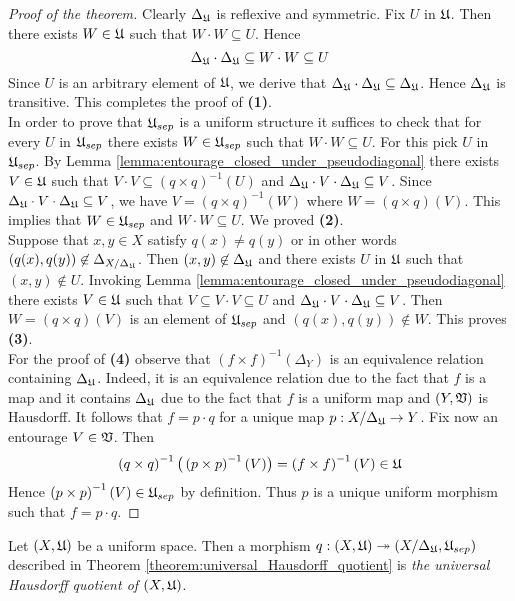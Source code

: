 \begin{proof}[Proof of the theorem]
Clearly $\Delta_{{\mathfrak U}}$ is reflexive and symmetric. Fix $U$ in ${\mathfrak U}$. Then there exists $W \in {\mathfrak U}$ such that $W\cdot W\subseteq U$. Hence 
$$\Delta_{{\mathfrak U}}\cdot \Delta_{{\mathfrak U}}\subseteq W\cdot W \subseteq U$$
Since $U$ is an arbitrary element of ${\mathfrak U}$, we derive that $\Delta_{{\mathfrak U}}\cdot \Delta_{{\mathfrak U}}\subseteq \Delta_{{\mathfrak U}}$. Hence $\Delta_{{\mathfrak U}}$ is transitive. This completes the proof of \textbf{(1)}.\\
In order to prove that ${\mathfrak U}_{sep}$ is a uniform structure it suffices to check that for every $U$ in ${\mathfrak U}_{sep}$ there exists $W \in {\mathfrak U}_{sep}$ such that $W\cdot W \subseteq U$. For this pick $U$ in ${\mathfrak U}_{sep}$. By Lemma \ref{lemma:entourage_closed_under_pseudodiagonal} there exists $V\in {\mathfrak U}$ such that $V\cdot V\subseteq \left(q\times q\right)^{-1}(U)$ and $\Delta_{{\mathfrak U}}\cdot V\cdot \Delta_{{\mathfrak U}}\subseteq V$. Since $\Delta_{{\mathfrak U}}\cdot V\cdot \Delta_{{\mathfrak U}}\subseteq V$, we have $V = \left(q\times q\right)^{-1}(W)$ where $W = \left(q\times q\right)\left(V\right)$. This implies that $W \in {\mathfrak U}_{sep}$ and $W\cdot W\subseteq U$. We proved \textbf{(2)}.\\
Suppose that $x,y \in X$ satisfy $q(x)\neq q(y)$ or in other words $\left(q(x),q(y)\right)\not \in \Delta_{X/\Delta_{{\mathfrak U}}}$. Then $(x,y) \not \in \Delta_{{\mathfrak U}}$ and there exists $U$ in ${\mathfrak U}$ such that $(x,y) \not \in U$. Invoking Lemma \ref{lemma:entourage_closed_under_pseudodiagonal} there exists $V\in {\mathfrak U}$ such that $V\subseteq V\cdot V \subseteq U$ and $\Delta_{{\mathfrak U}}\cdot V\cdot \Delta_{{\mathfrak U}}\subseteq V$. Then $W = \left(q\times q\right)(V)$ is an element of ${\mathfrak U}_{sep}$ and $\left(q(x),q(y)\right)\not \in W$. This proves \textbf{(3)}.\\
For the proof of \textbf{(4)} observe that $\left(f\times f\right)^{-1}\left(\Delta_Y\right)$ is an equivalence relation containing $\Delta_{{\mathfrak U}}$. Indeed, it is an equivalence relation due to the fact that $f$ is a map and it contains $\Delta_{{\mathfrak U}}$ due to the fact that $f$ is a uniform map and $(Y,{\mathfrak V})$ is Hausdorff. It follows that $f = p\cdot q$ for a unique map $p:X/\Delta_{{\mathfrak U}}\rightarrow Y$. Fix now an entourage $V \in {\mathfrak V}$. Then 
$$\left(q\times q\right)^{-1}\big(\left(p\times p\right)^{-1}(V)\big) = \left(f\times f\right)^{-1}(V) \in {\mathfrak U}$$
Hence $\left(p\times p\right)^{-1}(V) \in {\mathfrak U}_{sep}$ by definition. Thus $p$ is a unique uniform morphism such that $f = p\cdot q$.
\end{proof}

\begin{definition}
Let $(X,{\mathfrak U})$ be a uniform space. Then a morphism $q:\left(X,{\mathfrak U}\right)\twoheadrightarrow \left(X/\Delta_{{\mathfrak U}},{\mathfrak U}_{sep}\right)$ described in Theorem \ref{theorem:universal_Hausdorff_quotient} is \textit{the universal Hausdorff quotient of $\left(X,{\mathfrak U}\right)$}.
\end{definition}

